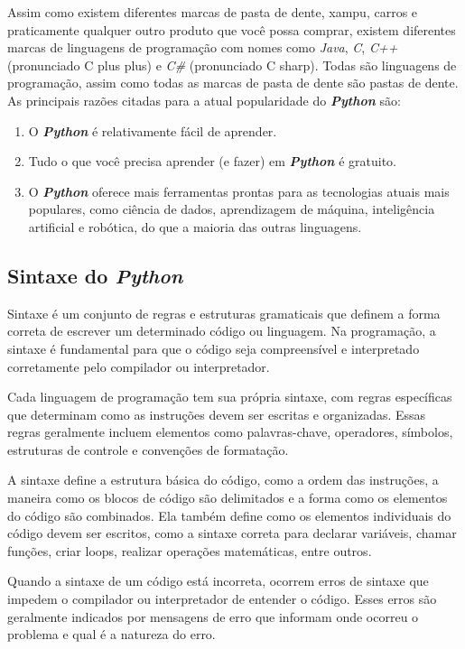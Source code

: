 \documentclass[a4paper, 12pt, onecolumn,singlespacing]{article}
\begin{document}
	Assim como existem diferentes marcas de pasta de dente, xampu, carros e praticamente qualquer outro produto que você possa comprar, existem diferentes marcas de linguagens de programação com nomes como \textit{Java}, \textit{C}, \textit{C++} (pronunciado C plus plus) e \textit{C\#} (pronunciado C sharp). Todas são linguagens de programação, assim como todas as marcas de pasta de dente são pastas de dente. As principais razões citadas para a atual popularidade do \textbf{\textit{Python}} são:
	\begin{enumerate}
		\item O \textbf{\textit{Python}} é relativamente fácil de aprender.
		\item Tudo o que você precisa aprender (e fazer) em \textbf{\textit{Python}} é gratuito.
		\item O \textbf{\textit{Python}} oferece mais ferramentas prontas para as tecnologias atuais mais populares, como ciência de dados, aprendizagem de máquina, inteligência artificial e robótica, do que a maioria das outras linguagens.
	\end{enumerate}
	
	\subsection{Sintaxe do \textit{Python}}
	\label{sintaxe_python}
	Sintaxe é um conjunto de regras e estruturas gramaticais que definem a forma correta de escrever um determinado código ou linguagem. Na programação, a sintaxe é fundamental para que o código seja compreensível e interpretado corretamente pelo compilador ou interpretador.
	
	Cada linguagem de programação tem sua própria sintaxe, com regras específicas que determinam como as instruções devem ser escritas e organizadas. Essas regras geralmente incluem elementos como palavras-chave, operadores, símbolos, estruturas de controle e convenções de formatação.
	
	A sintaxe define a estrutura básica do código, como a ordem das instruções, a maneira como os blocos de código são delimitados e a forma como os elementos do código são combinados. Ela também define como os elementos individuais do código devem ser escritos, como a sintaxe correta para declarar variáveis, chamar funções, criar loops, realizar operações matemáticas, entre outros.
	
	Quando a sintaxe de um código está incorreta, ocorrem erros de sintaxe que impedem o compilador ou interpretador de entender o código. Esses erros são geralmente indicados por mensagens de erro que informam onde ocorreu o problema e qual é a natureza do erro.
	
\end{document}
